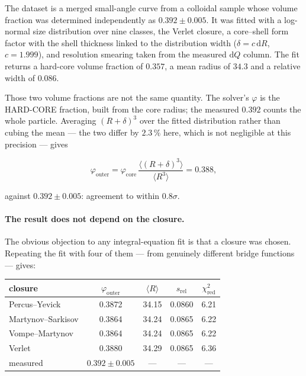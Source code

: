\documentclass[11pt,a4paper]{article}
\begin{document}
The dataset is a merged small-angle curve from a colloidal sample whose
volume fraction was determined independently as $0.392 \pm 0.005$. It was
fitted with a log-normal size distribution over nine classes, the Verlet
closure, a core--shell form factor with the shell thickness linked to the
distribution width ($\delta = c\,\mathrm{d}R$, $c = 1.999$), and resolution
smearing taken from the measured $\mathrm{d}Q$ column. The fit returns a
hard-core volume fraction of $0.357$, a mean radius of $34.3$ and a relative
width of $0.086$.

Those two volume fractions are not the same quantity. The solver's
$\varphi$ is the HARD-CORE fraction, built from the core radius; the
measured $0.392$ counts the whole particle. Averaging $(R+\delta)^3$ over
the fitted distribution rather than cubing the mean --- the two differ by
$2.3\,\%$ here, which is not negligible at this precision --- gives

\begin{equation}
\varphi_{\mathrm{outer}}
= \varphi_{\mathrm{core}}\,
  \frac{\langle (R+\delta)^3\rangle}{\langle R^3\rangle}
= 0.388 ,
\label{eq:phiouter}
\end{equation}

against $0.392 \pm 0.005$: agreement to within $0.8\sigma$.

\paragraph{The result does not depend on the closure.} The obvious objection
to any integral-equation fit is that a closure was chosen. Repeating the fit
with four of them --- from genuinely different bridge functions --- gives:

\begin{center}\small
\begin{tabular}{lcccc}
\toprule
closure & $\varphi_{\mathrm{outer}}$ & $\langle R\rangle$ & $s_{\mathrm{rel}}$
 & $\chi^2_{\mathrm{red}}$\\
\midrule
Percus--Yevick     & 0.3872 & 34.15 & 0.0860 & 6.21\\
Martynov--Sarkisov & 0.3864 & 34.24 & 0.0865 & 6.22\\
Vompe--Martynov    & 0.3864 & 34.24 & 0.0865 & 6.22\\
Verlet             & 0.3880 & 34.29 & 0.0865 & 6.36\\
\midrule
measured           & $0.392 \pm 0.005$ & --- & --- & ---\\
\bottomrule
\end{tabular}
\end{center}
\end{document}
